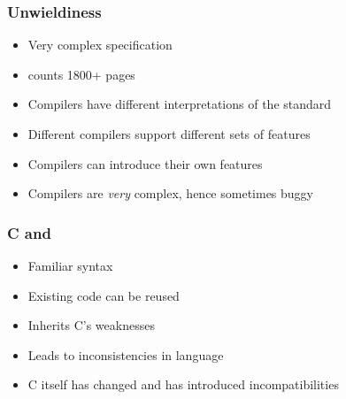 \begin{frame}
  \frametitle{Unwieldiness}
  \begin{itemize}
    \item Very complex specification
    \item {}
          counts 1800+ pages
    \item Compilers have different interpretations of the standard
    \item Different compilers support different sets of features
    \item Compilers can introduce their own features
    \item Compilers are \emph{very} complex, hence sometimes buggy
  \end{itemize}
\end{frame}

\begin{frame}
  \frametitle{C and \cpp}
  \begin{itemize}
    \item Familiar syntax
    \item Existing code can be reused
  \end{itemize}
  \vskip5mm
  \begin{itemize}
    \item Inherits C's weaknesses
    \item Leads to inconsistencies in language
  \end{itemize}
  \vskip5mm
  \begin{itemize}
    \item C itself has changed and has introduced incompatibilities
  \end{itemize}
\end{frame}

